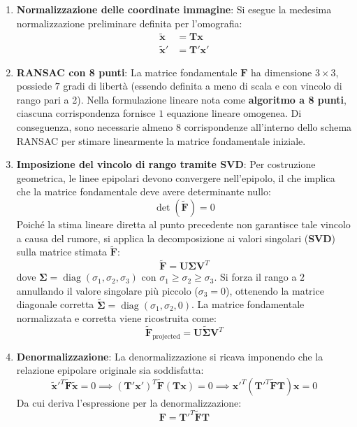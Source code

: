 ﻿\documentclass[11pt, a4paper]{article}
\begin{document}
\begin{enumerate}
    \item \textbf{Normalizzazione delle coordinate immagine}: Si esegue la medesima normalizzazione preliminare definita per l'omografia:
    \begin{align*}
        \tilde{\bm{x}} &= \bm{T}\bm{x} \\
        \tilde{\bm{x}}' &= \bm{T}'\bm{x}'
    \end{align*}

    \item \textbf{RANSAC con 8 punti}: La matrice fondamentale $\bm{F}$ ha dimensione $3 \times 3$, possiede $7$ gradi di libertà (essendo definita a meno di scala e con vincolo di rango pari a 2). Nella formulazione lineare nota come \textbf{algoritmo a 8 punti}, ciascuna corrispondenza fornisce $1$ equazione lineare omogenea. Di conseguenza, sono necessarie almeno $8$ corrispondenze all'interno dello schema RANSAC per stimare linearmente la matrice fondamentale iniziale.

    \item \textbf{Imposizione del vincolo di rango tramite SVD}: Per costruzione geometrica, le linee epipolari devono convergere nell'epipolo, il che implica che la matrice fondamentale deve avere determinante nullo:
    \[ \det(\tilde{\bm{F}}) = 0 \]
    Poiché la stima lineare diretta al punto precedente non garantisce tale vincolo a causa del rumore, si applica la decomposizione ai valori singolari (\textbf{SVD}) sulla matrice stimata $\tilde{\bm{F}}$:
    \[ \tilde{\bm{F}} = \bm{U}\bm{\Sigma}\bm{V}^T \]
    dove $\bm{\Sigma} = \operatorname{diag}(\sigma_1, \sigma_2, \sigma_3)$ con $\sigma_1 \ge \sigma_2 \ge \sigma_3$. Si forza il rango a $2$ annullando il valore singolare più piccolo ($\sigma_3 = 0$), ottenendo la matrice diagonale corretta $\tilde{\bm{\Sigma}} = \operatorname{diag}(\sigma_1, \sigma_2, 0)$. La matrice fondamentale normalizzata e corretta viene ricostruita come:
    \[ \tilde{\bm{F}}_{\text{projected}} = \bm{U}\tilde{\bm{\Sigma}}\bm{V}^T \]

    \item \textbf{Denormalizzazione}: La denormalizzazione si ricava imponendo che la relazione epipolare originale sia soddisfatta:
    \[ \tilde{\bm{x}}'^T \tilde{\bm{F}}\tilde{\bm{x}} = 0 \implies (\bm{T}'\bm{x}')^T \tilde{\bm{F}}(\bm{T}\bm{x}) = 0 \implies \bm{x}'^T \left( \bm{T}'^T \tilde{\bm{F}}\bm{T} \right) \bm{x} = 0 \]
    Da cui deriva l'espressione per la denormalizzazione:
    \[ \boxed{\bm{F} = \bm{T}'^T\tilde{\bm{F}}\bm{T}} \]
\end{enumerate}
\end{document}
